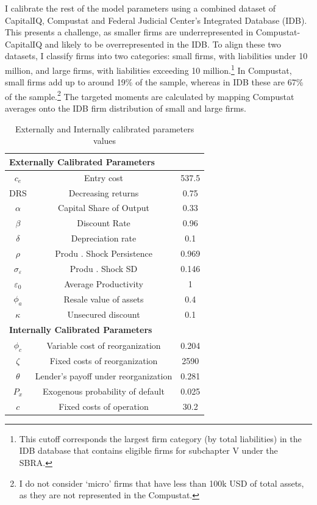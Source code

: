 \documentclass[12pt]{article}
\begin{document}
I calibrate the rest of the model parameters using a combined dataset of CapitalIQ, Compustat and Federal Judicial Center's Integrated Database (IDB). This presents a challenge, as smaller firms are underrepresented in Compustat-CapitalIQ and likely to be overrepresented in the IDB. To align these two datasets, I classify firms into two categories: small firms, with liabilities under 10 million, and large firms, with liabilities exceeding 10 million.\footnote{This cutoff corresponds the largest firm category (by total liabilities) in the IDB database that contains eligible firms for subchapter V under the SBRA.} In Compustat, small firms add up to around 19\% of the sample, whereas in IDB these are 67\% of the sample.\footnote{I do not consider `micro' firms that have less than 100k USD of total assets, as they are not represented in the Compustat.} The targeted moments are calculated by mapping Compustat averages onto the IDB firm distribution of small and large firms. 

\begin{table}[h!]
    \centering
    \begin{tabular}{c|c|c}
    \multicolumn{3}{l}{\textbf{Externally Calibrated Parameters}} \\ 
    \midrule
    $c_e$ & Entry cost & 537.5 \\
    DRS & Decreasing returns & 0.75 \\
    $\alpha$ & Capital Share of Output & 0.33 \\
    $\beta$ & Discount Rate & 0.96 \\
    $\delta$ & Depreciation rate & 0.1 \\
    $\rho$ & Produ . Shock Persistence & 0.969 \\
    $\sigma_{\varepsilon}$ & Produ . Shock SD & 0.146 \\
    $\varepsilon_0$ & Average Productivity & 1 \\
    $\phi_a$ & Resale value of assets & 0.4 \\
    $\kappa$ & Unsecured discount & 0.1 \vspace{3mm} \\
    \multicolumn{3}{l}{\textbf{Internally Calibrated Parameters}} \\ 
    \midrule
    $\phi_c$ & Variable cost of reorganization & 0.204 \\
    $\zeta$ & Fixed costs of reorganization & 2590 \\
    $ \theta $ & Lender's payoff under reorganization  & 0.281 \\
    $P_x$ & Exogenous probability of default & 0.025 \\
    $ c $ & Fixed costs of operation & 30.2 \\
    \bottomrule
    \end{tabular}
    \caption{Externally and Internally calibrated parameters values}
    \label{tab:external calib}
\end{table}
\end{document}
